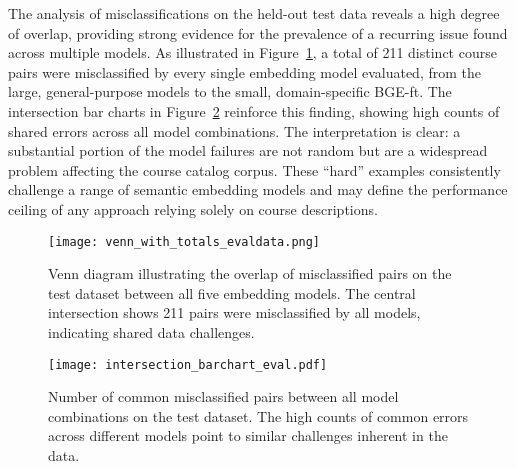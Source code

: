 The analysis of misclassifications on the held-out test data reveals a high degree of overlap, providing strong evidence for the prevalence of a recurring issue found across multiple models. As illustrated in Figure~\ref{fig:venn_misclassified}, a total of 211 distinct course pairs were misclassified by every single embedding model evaluated, from the large, general-purpose models to the small, domain-specific BGE-ft. The intersection bar charts in Figure~\ref{fig:intersection_barchart} reinforce this finding, showing high counts of shared errors across all model combinations. The interpretation is clear: a substantial portion of the model failures are not random but are a widespread problem affecting the course catalog corpus. These ``hard'' examples consistently challenge a range of semantic embedding models and may define the performance ceiling of any approach relying solely on course descriptions.
\begin{figure}[tb]
    \captionsetup{skip=5pt}
\centering
\texttt{[image: venn\_with\_totals\_evaldata.png]}
\caption[Venn Diagram of Misclassified Pairs]{Venn diagram illustrating the overlap of misclassified pairs on the test dataset between all five embedding models. The central intersection shows 211 pairs were misclassified by all models, indicating shared data challenges.}
\label{fig:venn_misclassified}
\end{figure}
\begin{figure}[tb]
    \captionsetup{skip=5pt}
\centering
\texttt{[image: intersection\_barchart\_eval.pdf]}
\caption[Model Overlap for Misclassified Pairs]{Number of common misclassified pairs between all model combinations on the test dataset. The high counts of common errors across different models point to similar challenges inherent in the data.}
\label{fig:intersection_barchart}
\end{figure}

